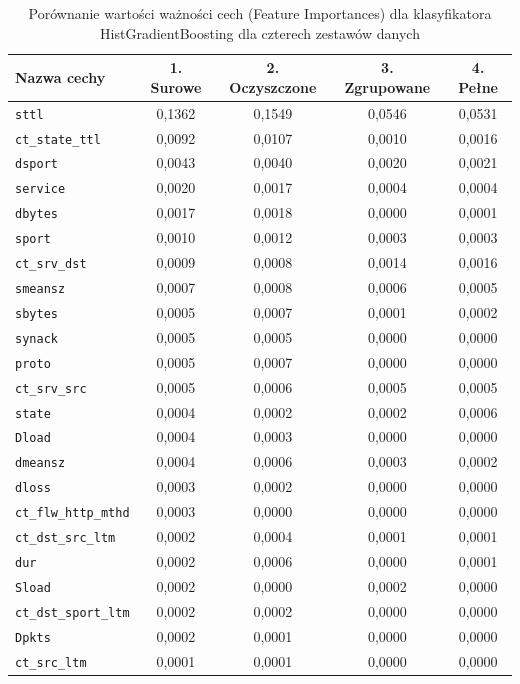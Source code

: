 \documentclass[12pt,twoside]{article}
\begin{document}
\begin{table}[htbp]
\caption{Porównanie wartości ważności cech (Feature Importances) dla klasyfikatora HistGradientBoosting dla czterech zestawów danych}
\centering
\begin{tabular}{|l|c|c|c|c|}
\hline
\textbf{Nazwa cechy} & \textbf{1. Surowe} & \textbf{2. Oczyszczone} & \textbf{3. Zgrupowane} & \textbf{4. Pełne} \\
\hline
\texttt{sttl} & 0,1362 & 0,1549 & 0,0546 & 0,0531 \\
\texttt{ct\_state\_ttl} & 0,0092 & 0,0107 & 0,0010 & 0,0016 \\
\texttt{dsport} & 0,0043 & 0,0040 & 0,0020 & 0,0021 \\
\texttt{service} & 0,0020 & 0,0017 & 0,0004 & 0,0004 \\
\texttt{dbytes} & 0,0017 & 0,0018 & 0,0000 & 0,0001 \\
\texttt{sport} & 0,0010 & 0,0012 & 0,0003 & 0,0003 \\
\texttt{ct\_srv\_dst} & 0,0009 & 0,0008 & 0,0014 & 0,0016 \\
\texttt{smeansz} & 0,0007 & 0,0008 & 0,0006 & 0,0005 \\
\texttt{sbytes} & 0,0005 & 0,0007 & 0,0001 & 0,0002 \\
\texttt{synack} & 0,0005 & 0,0005 & 0,0000 & 0,0000 \\
\texttt{proto} & 0,0005 & 0,0007 & 0,0000 & 0,0000 \\
\texttt{ct\_srv\_src} & 0,0005 & 0,0006 & 0,0005 & 0,0005 \\
\texttt{state} & 0,0004 & 0,0002 & 0,0002 & 0,0006 \\
\texttt{Dload} & 0,0004 & 0,0003 & 0,0000 & 0,0000 \\
\texttt{dmeansz} & 0,0004 & 0,0006 & 0,0003 & 0,0002 \\
\texttt{dloss} & 0,0003 & 0,0002 & 0,0000 & 0,0000 \\
\texttt{ct\_flw\_http\_mthd} & 0,0003 & 0,0000 & 0,0000 & 0,0000 \\
\texttt{ct\_dst\_src\_ltm} & 0,0002 & 0,0004 & 0,0001 & 0,0001 \\
\texttt{dur} & 0,0002 & 0,0006 & 0,0000 & 0,0001 \\
\texttt{Sload} & 0,0002 & 0,0000 & 0,0002 & 0,0000 \\
\texttt{ct\_dst\_sport\_ltm} & 0,0002 & 0,0002 & 0,0000 & 0,0000 \\
\texttt{Dpkts} & 0,0002 & 0,0001 & 0,0000 & 0,0000 \\
\texttt{ct\_src\_ltm} & 0,0001 & 0,0001 & 0,0000 & 0,0000 \\

\end{tabular}
\end{table}
\end{document}
